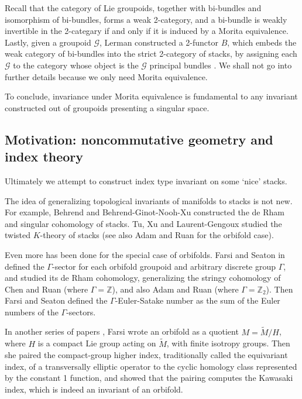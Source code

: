 \documentclass[a4paper]{amsart}
\newcommand\red[1]{\textcolor{red}{#1}}
\newcommand{\ZZ}{\mathbb Z}
\newcommand{\maG}{\mathcal G}
\newcommand\<{\langle}
\renewcommand\>{\rangle}
\theoremstyle{definition}
\theoremstyle{remark}
\begin{document}
Recall that the category of Lie groupoids, together with bi-bundles and isomorphism of bi-bundles,
forms a weak 2-category, and a bi-bundle is weakly invertible in the 2-categary
if and only if it is induced by a Morita equivalence.
Lastly, given a groupoid $\maG$, Lerman constructed a 2-functor $B$,
which embeds the weak category of bi-bundles into the strict 2-category of stacks,
by assigning each $\maG$ to the category whose object is the $\maG$ principal bundles \cite{Lerman10}.
We shall not go into further details because we only need Morita equivalence.

To conclude, invariance under Morita equivalence is fundamental
to any invariant constructed out of groupoids presenting a singular space.

\subsection{Motivation: noncommutative geometry and index theory}
Ultimately we attempt to construct index type invariant on some `nice' stacks.

The idea of generalizing topological invariants of manifolds to stacks is not new.
For example, Behrend \cite{Behrend;CohStack} and Behrend-Ginot-Nooh-Xu \cite{Xu;StackBook}
constructed the de Rham and singular cohomology of stacks.
Tu, Xu and Laurent-Gengoux studied the twisted $K$-theory of stacks \cite{TXLG04}
(see also Adam and Ruan \cite{Ruan;OrbifoldTwistedK} for the orbifold case).

Even more has been done for the special case of orbifolds.
Farsi and Seaton in \cite{FSPJM10,FSTAMS10} defined the $\Gamma$-sector
for each orbifold groupoid and arbitrary discrete group $\Gamma$, and studied its de Rham cohomology,
generalizing the stringy cohomology of Chen and Ruan \cite{Ruan;OrbifoldCoh, Ruan;OrbifoldCoh2} (where $\Gamma = \ZZ$),
and also Adam and Ruan \cite{Ruan;OrbifoldTwistedK} (where $\Gamma = \ZZ _2 $).
Then Farsi and Seaton \cite{FarsiSeaton11} defined the $\Gamma$-Euler-Satake number
as the sum of the Euler numbers of the $\Gamma$-sectors.

In another series of papers \cite{Farsi92PAMS, Farsi92}, Farsi wrote an orbifold as a quotient $M = \tilde M / H$,
where $H$ is a compact Lie group acting on $\tilde M$, with finite isotropy groups.
Then she paired the compact-group higher index, traditionally called the equivariant index,
of a transversally elliptic operator
to the cyclic homology class represented by the constant 1 function,
and showed that the pairing computes the Kawasaki index, which is indeed an invariant of an orbifold.
\end{document}
